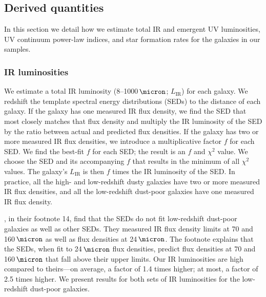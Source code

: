 \documentclass[preprint]{aastex}
\begin{document}
\subsection{Derived quantities}

In this section we detail how we estimate total IR and emergent UV
luminosities, UV continuum power-law indices, and star formation rates for the
galaxies in our samples.

\subsubsection{IR luminosities}

We estimate a total IR luminosity (8--1000$\,\micron$; $L_{\mathrm{IR}}$) for
each galaxy.  We redshift the \citet{chary01} template spectral energy
distributions (SEDs) to the distance of each galaxy.  If the galaxy has one
measured IR flux density, we find the SED that most closely matches that flux
density and multiply the IR luminosity of the SED by the ratio between actual
and predicted flux densities.  If the galaxy has two or more measured IR flux
densities, we introduce a multiplicative factor $f$ for each SED.  We find the
best-fit $f$ for each SED; the result is an $f$ and $\chi^{2}$ value.  We
choose the SED and its accompanying $f$ that results in the
minimum of all $\chi^{2}$ values.  The galaxy's $L_{\mathrm{IR}}$ is then $f$
times the IR luminosity of the SED.  In practice, all the high- and
low-redshift dusty galaxies have two or more measured IR flux densities, and
all the low-redshift dust-poor galaxies have one measured IR flux density.

\citet{overzier11}, in their footnote 14, find that the \citet{chary01} SEDs do
not fit low-redshift dust-poor galaxies as well as other SEDs.  They measured
IR flux density limits at 70 and 160$\,\micron$ as well as flux densities at
24$\,\micron$.  The footnote explains that the \citet{chary01} SEDs, when
fit to 24$\,\micron$ flux densities, predict flux densities at 70 and
160$\,\micron$ that fall above their upper limits.  Our IR luminosities are
high compared to theirs---on average, a factor of 1.4 times higher; at most, a
factor of 2.5 times higher.  We present results for both sets of IR
luminosities for the low-redshift dust-poor galaxies.
\end{document}
